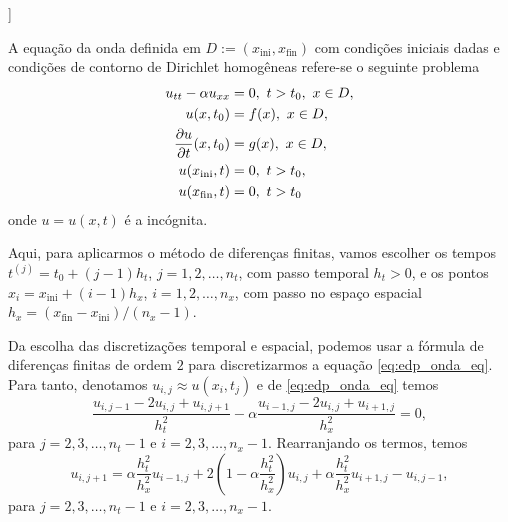 \begin{flushleft}
  [[tag:revisar]]
\end{flushleft}

A equação da onda definida em  $D := (x_{\text{ini}}, x_{\text{fin}})$ com condições iniciais dadas e condições de contorno de Dirichlet homogêneas refere-se o seguinte problema
\begin{align}
  u_{tt} - \alpha u_{xx} &= 0,~t>t_0,~x\in D, \label{eq:edp_onda_eq}\\
  u(x,t_0) &= f(x),~x\in D,\label{eq:edp_onda_ci1}\\
  \frac{\partial u}{\partial t}(x,t_0) &= g(x),~x\in D,\label{eq:edp_onda_ci2}\\
  u(x_{\text{ini}},t) &= 0,~t>t_0,\label{eq:edp_onda_bcxini}\\
  u(x_{\text{fin}},t) &= 0,~t>t_0\label{eq:edp_onda_bcxfin}
\end{align}
onde $u = u(x,t)$ é a incógnita.

Aqui, para aplicarmos o método de diferenças finitas, vamos escolher os tempos $t^{(j)} = t_0 + (j-1)h_t$, $j=1, 2, \dotsc, n_t$, com passo temporal $h_t>0$, e os pontos $x_i=x_{\text{ini}}+(i-1)h_x$, $i=1, 2, \dotsc, n_x$, com passo no espaço espacial $h_x = (x_{\text{fin}}-x_{\text{ini}})/(n_x-1)$.

Da escolha das discretizações temporal e espacial, podemos usar a fórmula de diferenças finitas de ordem $2$ para discretizarmos a equação \eqref{eq:edp_onda_eq}. Para tanto, denotamos $u_{i,j} \approx u(x_i,t_j)$ e de \eqref{eq:edp_onda_eq} temos
\begin{equation}
  \frac{u_{i,j-1}-2u_{i,j}+u_{i,j+1}}{h_t^2} - \alpha\frac{u_{i-1,j}-2u_{i,j}+u_{i+1,j}}{h_x^2} = 0,
\end{equation}
para $j=2, 3, \dotsc, n_t-1$ e $i=2, 3, \dotsc, n_x-1$. Rearranjando os termos, temos
\begin{equation}\label{eq:edp_onda_aux1}
  u_{i,j+1} = \alpha\frac{h_t^2}{h_x^2}u_{i-1,j} + 2\left(1-\alpha\frac{h_t^2}{h_x^2}\right)u_{i,j} + \alpha\frac{h_t^2}{h_x^2}u_{i+1,j} - u_{i,j-1},
\end{equation}
para $j=2, 3, \dotsc, n_t-1$ e $i=2, 3, \dotsc, n_x-1$.


